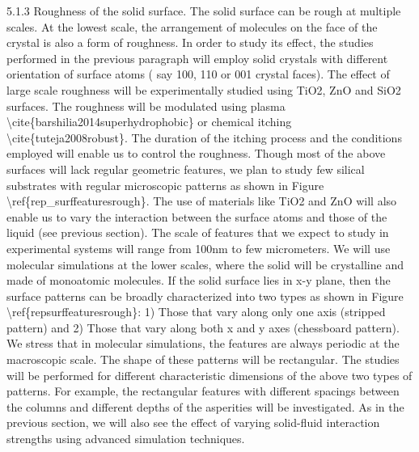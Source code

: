 \par 5.1.3 Roughness of the solid surface. The solid surface can be rough at multiple scales. At the lowest scale, the arrangement of molecules on the face of the crystal is also a form of roughness. In order to study its effect, the studies performed in the previous paragraph will employ solid crystals with different orientation of surface atoms ( say 100, 110 or 001 crystal faces). The effect of large scale roughness will be experimentally studied using TiO2, ZnO and SiO2 surfaces. The roughness will be modulated using plasma \textbackslash cite\{barshilia2014superhydrophobic\} or chemical itching \textbackslash cite\{tuteja2008robust\}. The duration of the itching process and the conditions employed will enable us to control the roughness. Though most of the above surfaces will lack regular geometric features, we plan to study few silical substrates with regular microscopic patterns as shown in Figure \textbackslash ref\{rep\_surffeaturesrough\}. The use of materials like TiO2 and ZnO will also enable us to vary the interaction between the surface atoms and those of the liquid (see previous section). The scale of features that we expect to study in experimental systems will range from 100nm to few micrometers. We will use molecular simulations at the lower scales, where the solid will be crystalline and made of monoatomic molecules. If the solid surface lies in x-y plane, then the surface patterns can be broadly characterized into two types as shown in Figure \textbackslash ref\{repsurffeaturesrough\}: 1) Those that vary along only one axis (stripped pattern) and 2) Those that vary along both x and y axes (chessboard pattern).  We stress that in molecular simulations, the features are always periodic at the macroscopic scale. The shape of these patterns will be rectangular. The studies will be performed for different characteristic dimensions of the above two types of patterns. For example, the rectangular features with different spacings between the columns and different depths of the asperities will be investigated.  As in the previous section, we will also see the effect of varying solid-fluid interaction strengths using advanced simulation techniques.
